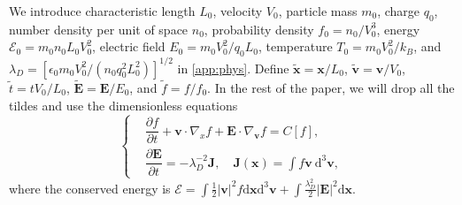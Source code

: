 \documentclass[preprint,1p,times]{elsarticle}
\theoremstyle{definition}
\theoremstyle{remark}
\begin{document}
We introduce characteristic length $L_{0}$, velocity $V_{0}$, particle mass $m_{0}$, charge $q_{0}$, number density per unit of space $n_{0}$, probability density $f_{0}=n_{0}/V_{0}^{3}$, energy $\mathcal{E}_{0} = m_{0} n_{0} L_{0} V_{0}^{2}$, electric field $E_{0} = m_{0} V_{0}^{2} / q_{0} L_{0}$, temperature $T_{0} = m_{0} V_{0}^{2} / k_{B}$, and $\lambda_{D} = [\epsilon_{0} m_{0} V_{0}^{2} / (n_{0} q_{0}^{2} L_{0}^{2})]^{1/2}$ in \ref{app:phys}.
Define $\tilde{\bm{x}} = \bm{x} / L_{0}$, $\tilde{\bm{v}} = \bm{v}/V_{0}$, $\tilde{t} = t V_{0} / L_{0}$, $\tilde{\bm{E}} = \bm{E}/E_{0}$, and $\tilde{f} = f / f_{0}$.
In the rest of the paper, we will drop all the tildes and use the dimensionless equations
\begin{equation}\label{eq:VAC}
    \left\{
    \begin{aligned}
        &\dfrac{\partial f}{\partial t} + \bm{v} \cdot \nabla_{x} f + \bm{E} \cdot \nabla_{\bm{v}} f  = C[f] , \\ %
        &\dfrac{\partial \bm{E}}{\partial t} = - \lambda_{D}^{-2} \bm{J}, \quad \bm{J}(\bm{x}) = \int f\bm{v} ~ \mathrm{d}^{3} \bm{v} ,
    \end{aligned}
    \right.
\end{equation}
where the conserved energy is $\mathcal{E} = \int \frac{1}{2} |\bm{v}|^{2} f \mathrm{d} \bm{x} \mathrm{d}^{3} \bm{v} + \int \frac{\lambda_{D}^{2}}{2} |\bm{E}|^{2} \mathrm{d} \bm{x}$.
\end{document}

